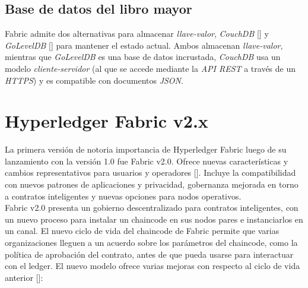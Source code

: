 \subsection{Base de datos del libro mayor}
Fabric admite dos alternativas para almacenar \emph{llave-valor}, \emph{CouchDB} [\cite{CouchDB}] y \emph{GoLevelDB} [\cite{GoLevelDB}] para mantener el estado actual. Ambos almacenan \emph{llave-valor}, mientras que \emph{GoLevelDB} es una base de datos incrustada, \emph{CouchDB} usa un modelo \emph{cliente-servidor} (al que se accede mediante la \emph{API REST} a trav\'es de un \emph{HTTPS}) y es compatible con documentos \emph{JSON}.

\section{Hyperledger Fabric v2.x}
La primera versi\'on de notoria importancia de Hyperledger Fabric luego de su lanzamiento con la versi\'on 1.0 fue Fabric v2.0. Ofrece nuevas caracter\'isticas y cambios representativos para usuarios y operadores [\cite{NewHF}]. Incluye la compatibilidad con nuevos patrones de aplicaciones y privacidad, gobernanza mejorada en torno a contratos inteligentes y nuevas opciones para nodos operativos.\\

Fabric v2.0 presenta un gobierno descentralizado para contratos inteligentes, con un nuevo proceso para instalar un chaincode en sus nodos pares e instanciarlos en un canal. El nuevo ciclo de vida del chaincode de Fabric permite que varias organizaciones lleguen a un acuerdo sobre los par\'ametros del chaincode, como la pol\'itica de aprobaci\'on del contrato, antes de que pueda usarse para interactuar con el ledger. El nuevo modelo ofrece varias mejoras con respecto al ciclo de vida anterior [\cite{hyperledger2018hyperledger}]:

